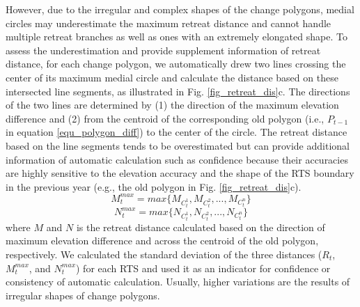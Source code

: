 \documentclass[authoryear,preprint,review,12pt]{elsarticle}
\begin{document}
However, due to the irregular and complex shapes of the change polygons, medial circles may underestimate the maximum retreat distance and cannot handle multiple retreat branches as well as ones with an extremely elongated shape. 
To assess the underestimation and provide supplement information of retreat distance, for each change polygon, we automatically 
drew two lines crossing the center of its maximum medial circle and calculate the distance based on these intersected line segments, as illustrated in Fig. \ref{fig_retreat_dis}c. 
The directions of the two lines are determined by (1) the direction of the maximum elevation difference and (2) from the centroid of the corresponding old polygon (i.e., $P_{t-1}$ in equation \ref{equ_polygon_diff}) to the center of the circle. 
The retreat distance based on the line segments tends to be overestimated but can provide additional information of automatic calculation such as confidence because their accuracies are highly sensitive to the elevation accuracy and the shape of the RTS boundary in the previous year (e.g., the old polygon in Fig. \ref{fig_retreat_dis}c). 
\begin{equation}
M_t^{max} = max\{M_{C_t^1},M_{C_t^2},...,M_{C_t^n}\}
\label{equ_dis_slope}
\end{equation}
\begin{equation}
N_t^{max} = max\{N_{C_t^1},N_{C_t^2},...,N_{C_t^n}\}
\label{equ_dis_centroid}
\end{equation}
where $M$ and $N$ is the retreat distance calculated based on the direction of maximum elevation difference and across the centroid of the old polygon, respectively.
We calculated the standard deviation of the three distances ($R_t$, $M_t^{max}$, and $N_t^{max}$) for each RTS and used it as an indicator for confidence or consistency of automatic calculation. 
Usually, higher variations are the results of irregular shapes of change polygons.
\end{document}
